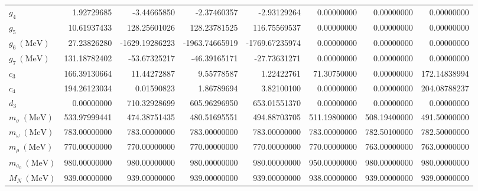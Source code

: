 \begin{table}[t]
\begin{tabular}{lrrrrrrr}
$g_{4}$ & 1.92729685 & -3.44665850 & -2.37460357 & -2.93129264 & 0.00000000 & 0.00000000 & 0.00000000 \\
$g_{5}$ & 10.61937433 & 128.25601026 & 128.23781525 & 116.75569537 & 0.00000000 & 0.00000000 & 0.00000000 \\
$g_{6}\ (\mathrm{MeV})$ & 27.23826280 & -1629.19286223 & -1963.74665919 & -1769.67235974 & 0.00000000 & 0.00000000 & 0.00000000 \\
$g_{7}\ (\mathrm{MeV})$ & 131.18782402 & -53.67325217 & -46.39165171 & -27.73631271 & 0.00000000 & 0.00000000 & 0.00000000 \\
$c_{3}$ & 166.39130664 & 11.44272887 & 9.55778587 & 1.22422761 & 71.30750000 & 0.00000000 & 172.14838994 \\
$c_{4}$ & 194.26123034 & 0.01590823 & 1.86789694 & 3.82100100 & 0.00000000 & 0.00000000 & 204.08788237 \\
$d_{3}$ & 0.00000000 & 710.32928699 & 605.96296950 & 653.01551370 & 0.00000000 & 0.00000000 & 0.00000000 \\
$m_\sigma\ (\mathrm{MeV})$ & 533.97999441 & 474.38751435 & 480.51695551 & 494.88703705 & 511.19800000 & 508.19400000 & 491.50000000 \\
$m_\omega\ (\mathrm{MeV})$ & 783.00000000 & 783.00000000 & 783.00000000 & 783.00000000 & 783.00000000 & 782.50100000 & 782.50000000 \\
$m_\rho\ (\mathrm{MeV})$ & 770.00000000 & 770.00000000 & 770.00000000 & 770.00000000 & 770.00000000 & 763.00000000 & 763.00000000 \\
$m_{a_0}\ (\mathrm{MeV})$ & 980.00000000 & 980.00000000 & 980.00000000 & 980.00000000 & 950.00000000 & 980.00000000 & 980.00000000 \\
$M_N\ (\mathrm{MeV})$ & 939.00000000 & 939.00000000 & 939.00000000 & 939.00000000 & 938.00000000 & 939.00000000 & 939.00000000 \\
\hline
\end{tabular}
\end{table}

